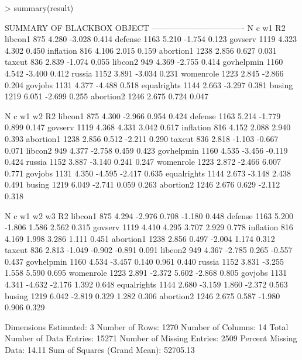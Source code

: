 \documentclass[nojss]{jss}
\begin{document}
\begin{Schunk}
\begin{Sinput}
> summary(result)
\end{Sinput}
\begin{Soutput}
SUMMARY OF BLACKBOX OBJECT
----------------------------------
               N     c     w1    R2
libcon1      875 4.280 -3.028 0.414
defense     1163 5.210 -1.754 0.123
govserv     1119 4.323  4.302 0.450
inflation    816 4.106  2.015 0.159
abortion1   1238 2.856  0.627 0.031
taxcut       836 2.839 -1.074 0.055
libcon2      949 4.369 -2.755 0.414
govhelpmin  1160 4.542 -3.400 0.412
russia      1152 3.891 -3.034 0.231
womenrole   1223 2.845 -2.866 0.204
govjobs     1131 4.377 -4.488 0.518
equalrights 1144 2.663 -3.297 0.381
busing      1219 6.051 -2.699 0.255
abortion2   1246 2.675  0.724 0.047

               N     c     w1     w2    R2
libcon1      875 4.300 -2.966  0.954 0.424
defense     1163 5.214 -1.779  0.899 0.147
govserv     1119 4.368  4.331  3.042 0.617
inflation    816 4.152  2.088  2.940 0.393
abortion1   1238 2.856  0.512 -2.211 0.290
taxcut       836 2.818 -1.103 -0.667 0.071
libcon2      949 4.377 -2.758  0.459 0.423
govhelpmin  1160 4.535 -3.456 -0.119 0.424
russia      1152 3.887 -3.140  0.241 0.247
womenrole   1223 2.872 -2.466  6.007 0.771
govjobs     1131 4.350 -4.595 -2.417 0.635
equalrights 1144 2.673 -3.148  2.438 0.491
busing      1219 6.049 -2.741  0.059 0.263
abortion2   1246 2.676  0.629 -2.112 0.318

               N     c     w1     w2     w3    R2
libcon1      875 4.294 -2.976  0.708 -1.180 0.448
defense     1163 5.200 -1.806  1.586  2.562 0.315
govserv     1119 4.410  4.295  3.707  2.929 0.778
inflation    816 4.169  1.998  3.286  1.111 0.451
abortion1   1238 2.856  0.497 -2.004  1.174 0.312
taxcut       836 2.813 -1.049 -0.902 -0.891 0.091
libcon2      949 4.367 -2.785  0.265 -0.557 0.437
govhelpmin  1160 4.534 -3.457  0.140  0.961 0.440
russia      1152 3.831 -3.255  1.558  5.590 0.695
womenrole   1223 2.891 -2.372  5.602 -2.868 0.805
govjobs     1131 4.341 -4.632 -2.176  1.392 0.648
equalrights 1144 2.680 -3.159  1.860 -2.372 0.563
busing      1219 6.042 -2.819  0.329  1.282 0.306
abortion2   1246 2.675  0.587 -1.980  0.906 0.329

	Dimensions Estimated: 3
	Number of Rows: 1270
	Number of Columns: 14
	Total Number of Data Entries: 15271
	Number of Missing Entries: 2509
	Percent Missing Data: 14.11%
	Sum of Squares (Grand Mean): 52705.13
\end{Soutput}
\end{Schunk}
\end{document}
